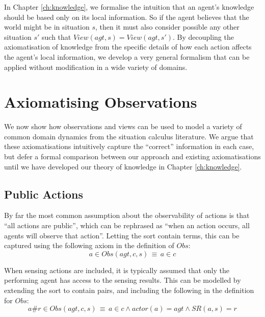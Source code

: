 In Chapter \ref{ch:knowledge}, we formalise the intuition that an
agent's knowledge should be based only on its local information. So
if the agent believes that the world might be in situation $s$, then
it must also consider possible any other situation $s'$ such that
$View(agt,s)=View(agt,s')$. By decoupling the axiomatisation of knowledge
from the specific details of how each action affects the agent's local
information, we develop a very general formalism that can be applied
without modification in a wide variety of domains.


\section{Axiomatising Observations\label{sec:Observations:Axiomatising-simple}}

We now show how observations and views can be used to model a variety
of common domain dynamics from the situation calculus literature.
We argue that these axiomatisations intuitively capture the {}``correct''
information in each case, but defer a formal comparison between our
approach and existing axiomatisations until we have developed our
theory of knowledge in Chapter \ref{ch:knowledge}.


\subsection{Public Actions}

By far the most common assumption about the observability of actions
is that {}``all actions are public'', which can be rephrased as
{}``when an action occurs, all agents will observe that action''.
Letting the sort contain terms, this
can be captured using the following axiom in the definition of $Obs$:\begin{equation}
a\in Obs(agt,c,s)\,\equiv\, a\in c\label{eq:Observations:ObsStd1}\end{equation}


When sensing actions are included, it is typically assumed that only
the performing agent has access to the sensing results. This can be
modelled by extending the  sort to contain 
pairs, and including the following in the definition for $Obs$:\begin{equation}
a\#r\in Obs(agt,c,s)\,\equiv\, a\in c\wedge actor(a)=agt\wedge SR(a,s)=r\label{eq:Observations:ObsStd2}\end{equation}


